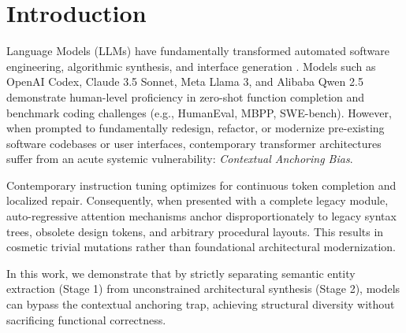 \documentclass[10pt,journal,compsoc]{IEEEtran}
\begin{document}
\maketitle
\IEEEdisplaynontitleabstractindextext
\IEEEpeerreviewmaketitle

\section{Introduction}
 Language Models (LLMs) have fundamentally transformed automated software engineering, algorithmic synthesis, and interface generation \cite{vaswani2017attention, chen2021evaluating}. Models such as OpenAI Codex, Claude 3.5 Sonnet, Meta Llama 3, and Alibaba Qwen 2.5 demonstrate human-level proficiency in zero-shot function completion and benchmark coding challenges (e.g., HumanEval, MBPP, SWE-bench). However, when prompted to fundamentally redesign, refactor, or modernize pre-existing software codebases or user interfaces, contemporary transformer architectures suffer from an acute systemic vulnerability: \textit{Contextual Anchoring Bias}.

Contemporary instruction tuning optimizes for continuous token completion and localized repair. Consequently, when presented with a complete legacy module, auto-regressive attention mechanisms anchor disproportionately to legacy syntax trees, obsolete design tokens, and arbitrary procedural layouts. This results in cosmetic trivial mutations rather than foundational architectural modernization.

In this work, we demonstrate that by strictly separating semantic entity extraction (Stage 1) from unconstrained architectural synthesis (Stage 2), models can bypass the contextual anchoring trap, achieving structural diversity without sacrificing functional correctness.
\end{document}
